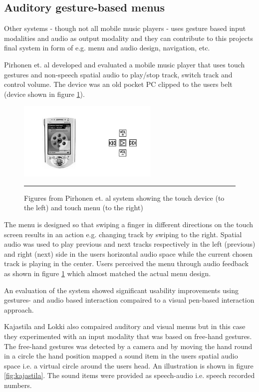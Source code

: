\subsection{Auditory gesture-based menus}
Other systems - though not all mobile music players - uses gesture based input modalities and audio as output modality and they can contribute to this projects final system in form of e.g. menu and audio design, navigation, etc.

Pirhonen et. al \cite{pirhonen_gestural_2002} developed and evaluated a mobile music player that uses touch gestures and non-speech spatial audio to play/stop track, switch track and control volume. The device was an old pocket PC clipped to the users belt (device shown in figure \ref{fig:pirhonen}).

\begin{figure}[htbp]
	\centering
		\includegraphics[width=0.6\textwidth,height=\textheight,keepaspectratio]{./Figures/pirhonen-system.png}
		\rule{35em}{0.5pt}
	\caption[Pirhonen system]{Figures from Pirhonen et. al \cite{pirhonen_gestural_2002} system showing the touch device (to the left) and touch menu (to the right)}
	\label{fig:pirhonen}
\end{figure}

The menu is designed so that swiping a finger in different directions on the touch screen results in an action e.g. changing track by swiping to the right. Spatial audio was used to play previous and next tracks respectively in the left (previous) and right (next) side in the users horizontal audio space while the current chosen track is playing in the center. Users perceived the menu through audio feedback as shown in figure \ref{fig:pirhonen} which almost matched the actual menu design.

An evaluation of the system showed significant usability improvements using gestures- and audio based interaction compaired to a visual pen-based interaction approach.


Kajastila and Lokki \cite{kajastila_interaction_2013} also compaired auditory and visual menus but in this case they experimented with an input modality that was based on free-hand gestures. The free-hand gestures was detected by a camera and by moving the hand round in a circle the hand position mapped a sound item in the users spatial audio space i.e. a virtual circle around the users head. An illustration is shown in figure \ref{fig:kajastila}. The sound items were provided as speech-audio i.e. speech recorded numbers.

